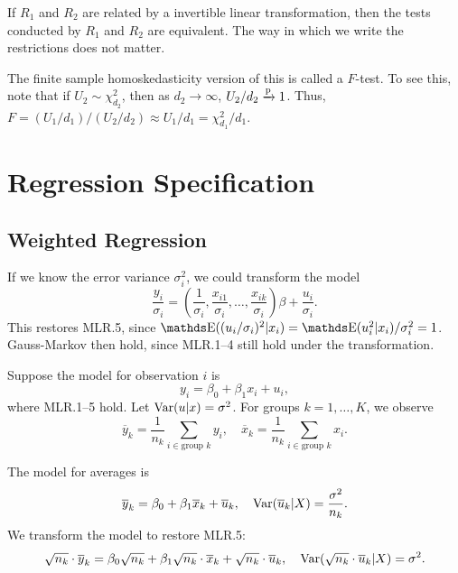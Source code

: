 \documentclass[letterpaper, 10pt]{article}
\begin{document}
\begin{remark}
  If \(R_1\) and \(R_2\) are related by a invertible linear transformation, then the tests conducted by \(R_1\) and \(R_2\) are equivalent.
  The way in which we write the restrictions does not matter.
\end{remark}

\begin{remark}
  The finite sample homoskedasticity version of this is called a \(F\)-test.
  To see this, note that if \(U_2 \sim \chi_{d_2}^2\), then as \(d_2 \to \infty\), \(U_2 / d_2 \xrightarrow{\mathrm{p}} 1\).
  Thus, \(F = (U_1 / d_1) / (U_2 / d_2) \approx U_1 / d_1 = \chi_{d_1}^2 / d_1\).
\end{remark}


\section{Regression Specification}
\subsection{Weighted Regression}
If we know the error variance \(\sigma_i^2\), we could transform the model
\[
  \frac{y_i}{\sigma_i} = \left( \frac{1}{\sigma_i}, \frac{x_{i 1}}{\sigma_i}, \dots, \frac{x_{i k}}{\sigma_i} \right) \beta + \frac{u_i}{\sigma_i}.
\]
This restores MLR.5, since \(\E((u_i / \sigma_i)^2 | x_i) = \E(u_i^2 | x_i) / \sigma_i^2 = 1\).
Gauss-Markov then hold, since MLR.1--4 still hold under the transformation.

\begin{example}
  Suppose the model for observation \(i\) is
  \[
    y_i = \beta_0 + \beta_1 x_i + u_i,
  \]
  where MLR.1--5 hold.
  Let \(\operatorname{Var}(u|x) = \sigma^2\).
  For groups \(k = 1, \dots, K\), we observe
  \[
    \overline{y}_k = \frac{1}{n_k} \sum_{i \in \text{group } k} y_i, \quad
    \overline{x}_k = \frac{1}{n_k} \sum_{i \in \text{group } k} x_i.
  \]

  The model for averages is
  \[
    \overline{y}_k = \beta_0 + \beta_1 \overline{x}_k + \overline{u}_k, \quad
    \operatorname{Var}(\overline{u}_k | X) = \frac{\sigma^2}{n_k}.
  \]
  We transform the model to restore MLR.5:
  \[
    \sqrt{n_k} \cdot \overline{y}_k
    = \beta_0 \sqrt{n_k} + \beta_1 \sqrt{n_k} \cdot \overline{x}_k + \sqrt{n_k} \cdot \overline{u}_k, \quad
    \operatorname{Var}(\sqrt{n_k} \cdot \overline{u}_k | X) = \sigma^2.
  \]
\end{example}
\end{document}
